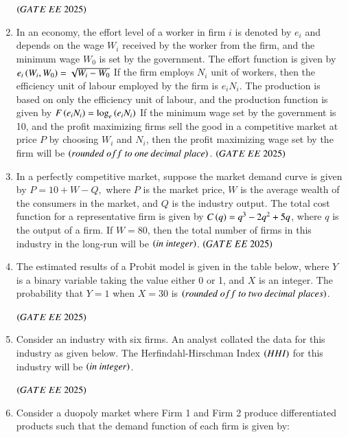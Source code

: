 \documentclass[journal,12pt,onecolumn]{IEEEtran}
\theoremstyle{remark}
\begin{document}
\begin{enumerate}

 \hfill $\brak{GATE\ EE\ 2025}$
\item In an economy, the effort level of a worker in firm $i$ is denoted by $e_i$ and depends on the wage $W_i$ received by the worker from the firm, and the minimum wage $W_0$ is set by the government. The effort function is given by 
$
e_i\left(W_i, W_0\right) = \sqrt{W_i - W_0}
$
If the firm employs $N_i$ unit of workers, then the efficiency unit of labour employed by the firm is $e_i N_i$. The production is based on only the efficiency unit of labour, and the production function is given by
$
F\left(e_i N_i\right) = \log_e \left(e_i N_i\right)
$
If the minimum wage set by the government is 10, and the profit maximizing firms sell the good in a competitive market at price $P$ by choosing $W_i$ and $N_i$, then the profit maximizing wage set by the firm will be \underline{\hspace{2cm}} $\brak{rounded\ off\ to\ one\ decimal\ place}$. 
 \hfill $\brak{GATE\ EE\ 2025}$
\item In a perfectly competitive market, suppose the market demand curve is given by 
$
P = 10 + W - Q,
$
where $P$ is the market price, $W$ is the average wealth of the consumers in the market, and $Q$ is the industry output. The total cost function for a representative firm is given by $C\left(q\right) = q^3 - 2q^2 + 5q$, where $q$ is the output of a firm. If $W = 80$, then the total number of firms in this industry in the long-run will be \underline{\hspace{2cm}} $\left(in\ integer\right)$.
 \hfill $\brak{GATE\ EE\ 2025}$
\item The estimated results of a Probit model is given in the table below, where $Y$ is a binary variable taking the value either 0 or 1, and $X$ is an integer. The probability that $Y = 1$ when $X = 30$ is \underline{\hspace{2cm}} $\brak{rounded\ off \ to \ two\ decimal\ places}$.  

\begin{center}

\end{center}
 \hfill $\brak{GATE\ EE\ 2025}$
\item Consider an industry with six firms. An analyst collated the data for this industry as given below. The Herfindahl-Hirschman Index $\left(HHI\right)$ for this industry will be \underline{\hspace{2cm}} $\left(in\ integer\right)$.
\begin{center}

\end{center} 
 \hfill $\brak{GATE\ EE\ 2025}$
\item Consider a duopoly market where Firm 1 and Firm 2 produce differentiated products such that the demand function of each firm is given by:

\end{enumerate}
\end{document}
